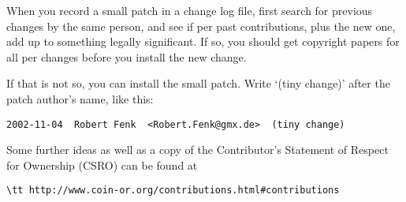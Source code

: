 When you record a small patch in a change log file, first search for previous changes by the same person, and see if per past contributions, plus the new one, add up to something legally significant. If so, you should get copyright papers for all per changes before you install the new change.
 
If that is not so, you can install the small patch. Write ‘(tiny change)’ after the patch author’s name, like this:
 
\begin{verbatim}
2002-11-04  Robert Fenk  <Robert.Fenk@gmx.de>  (tiny change)
\end{verbatim}

\medskip

Some further ideas as well as a copy of the Contributor's Statement of Respect for Ownership (CSRO)
can be found at %
\begin{verbatim}
\tt http://www.coin-or.org/contributions.html#contributions
\end{verbatim}